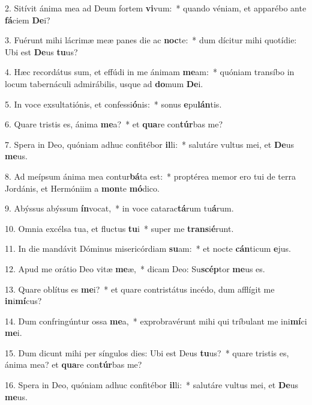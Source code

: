 2. Sitívit ánima mea ad Deum fortem \textbf{vi}vum:~*  quando véniam, et apparébo ante \textbf{fá}ciem \textbf{De}i?\

3. Fuérunt mihi lácrimæ meæ panes die ac \textbf{noc}te:~*  dum dícitur mihi quotídie: Ubi est \textbf{De}us \textbf{tu}us?\

4. Hæc recordátus sum, et effúdi in me ánimam \textbf{me}am:~*  quóniam transíbo in locum tabernáculi admirábilis, usque ad \textbf{do}mum \textbf{De}i.\

5. In voce exsultatiónis, et confessi\textbf{ó}nis:~*  sonus \textbf{e}pu\textbf{lán}tis.\

6. Quare tristis es, ánima \textbf{me}a?~*  et \textbf{qua}re con\textbf{túr}bas me?\

7. Spera in Deo, quóniam adhuc confitébor \textbf{il}li:~*  salutáre vultus mei, et \textbf{De}us \textbf{me}us.\

8. Ad meípsum ánima mea contur\textbf{bá}ta est:~*  proptérea memor ero tui de terra Jordánis, et Hermóniim a \textbf{mon}te \textbf{mó}dico.\

9. Abýssus abýssum \textbf{ín}vocat,~*  in voce catarac\textbf{tá}rum tu\textbf{á}rum.\

10. Omnia excélsa tua, et fluctus \textbf{tu}i~*  super me \textbf{trans}i\textbf{é}runt.\

11. In die mandávit Dóminus misericórdiam \textbf{su}am:~*  et nocte \textbf{cán}ticum \textbf{e}jus.\

12. Apud me orátio Deo vitæ \textbf{me}æ,~*  dicam Deo: Su\textbf{scép}tor \textbf{me}us es.\

13. Quare oblítus es \textbf{me}i?~*  et quare contristátus incédo, dum afflígit me \textbf{in}i\textbf{mí}cus?\

14. Dum confringúntur ossa \textbf{me}a,~*  exprobravérunt mihi qui tríbulant me ini\textbf{mí}ci \textbf{me}i.\

15. Dum dicunt mihi per síngulos dies: Ubi est Deus \textbf{tu}us?~*  quare tristis es, ánima mea? et \textbf{qua}re con\textbf{túr}bas me?\

16. Spera in Deo, quóniam adhuc confitébor \textbf{il}li:~*  salutáre vultus mei, et \textbf{De}us \textbf{me}us.\


